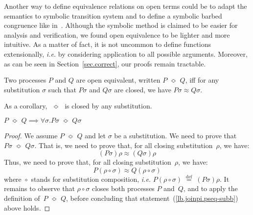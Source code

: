 \documentclass{LMCS}
\makeatletter
\newcommand{\forget}[1]{}
\newcommand{\resetequationcounter}{\setcounter{equation}{0}}
\newcommand{\ie}{\emph{i.e.}\@\xspace}
\renewcommand{\_}{\mathord{\rule[-.25ex]{1ex}{.15ex}}}
\newcommand{\defineas}{\;\stackrel{\mathrm{def}}=\;}
\newcommand{\sub}[2]{#1#2}
\newcommand{\composite}[2]{#1 \mathop{\circ} #2}
\newcommand{\wbc}{\mathrel{\approx}}
\newcommand{\pseq}{\;\mathop{\Bumpeq}\;}
\makeatother
\begin{document}
Another way to define equivalence relations on open terms could be to
adapt the semantics to symbolic transition system and to define a
symbolic barbed congruence like in~\cite{SymbolicBisi}.  Although the
symbolic method is claimed to be easier for analysis and verification,
we found open equivalence to be lighter and more intuitive.  As a
matter of fact, it is not uncommon to define functions extensionally,
\ie by considering application to all possible arguments.  Moreover,
as can be seen in Section~\ref{sec.correct}, our proofs remain
tractable.
\begin{defi}[Open equivalence $\pseq$]
  \label{def.joinpi.pseq}
  Two processes $P$ and $Q$ are open equivalent, written $P\pseq Q$,
  iff for any substitution $\sigma$ such that ${P}{\sigma}$ and
  ${Q}{\sigma}$ are closed, we have ${P}{\sigma} \wbc {Q}{\sigma}$.
\end{defi}
As a corollary, $\pseq$ is closed by any substitution.
\begin{lem}\label{lemma.pseq-sub}
  $P \pseq Q \implies \forall \sigma. \sub{P}{\sigma} \pseq
  \sub{Q}{\sigma}$
\end{lem}
\resetequationcounter
\begin{proof}
  We assume $P \pseq Q$ and let $\sigma$ be a substitution. We need to
  prove that $P\sigma \pseq Q\sigma$. That is,
  we need to prove that, for all closing substitution~$\rho$, we
  have:
\begin{equation*}
{({P}{\sigma})}{\rho} \wbc
    {({Q}{\sigma})}{\rho}
\end{equation*}
Thus, we need to prove that, for all closing substitution~$\rho$, we
have:
\begin{equation}
 {P}{(\composite{\rho}{\sigma})} \wbc
  {Q}{(\composite{\rho}{\sigma})} \label{lb.joinpi.pseq-subb}
\end{equation}
where $\composite{}{}$ stands for substitution composition, \ie
$P(\composite{\rho}{\sigma})\defineas (P\sigma)\rho$.
It remains to observe that
$\composite{\rho}{\sigma}$ closes both processes $P$ and~$Q$,
and to apply the definition of~$P \pseq Q$, before concluding
that statement~(\ref{lb.joinpi.pseq-subb}) above holds. \forget{\qed}
\end{proof}
\end{document}
